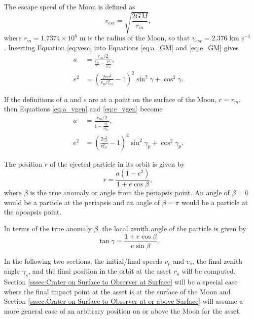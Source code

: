\documentclass{article}
\begin{document}
The escape speed of the Moon is defined as
\begin{equation}\label{eq:vesc}
v_{esc} = \sqrt{\frac{2GM}{r_m}},
\end{equation}
where $r_m = 1.7374\times 10^{6}$ m is the radius of the Moon, so that $v_{esc} = 2.376$ km s$^{-1}$. Inserting Equation \eqref{eq:vesc} into Equations \eqref{eq:a_GM} and \eqref{eq:e_GM} gives
\begin{align}
a &= \frac{r_m/2}{\frac{r_m}{r} - \frac{v^2}{v_{esc}^2}},\label{eq:a_vgen}\\
e^2 &= \left(\frac{2rv^2}{r_m v_{esc}^2} - 1\right)^2\sin^2\gamma + \cos^2\gamma.\label{eq:e_vgen}
\end{align}

If the definitions of $a$ and $e$ are at a point on the surface of the Moon, $r = r_m$, then Equations \eqref{eq:a_vgen} and \eqref{eq:e_vgen} become
\begin{align}
a &= \frac{r_m/2}{1 - \frac{v_p^2}{v_{esc}^2}},\label{eq:a_vrm}\\
e^2 &= \left(\frac{2v_p^2}{v_{esc}^2} - 1\right)^2\sin^2\gamma_p + \cos^2\gamma_p.\label{eq:e_vrm}
\end{align}

The position $r$ of the ejected particle in its orbit is given by
\begin{equation}\label{eq:r_orbit}
r = \frac{a(1-e^2)}{1+e\cos\beta},
\end{equation}
where $\beta$ is the true anomaly or angle from the periapsis point. An angle of $\beta=0$ would be a particle at the periapsis and an angle of $\beta=\pi$ would be a particle at the apoapsis point.

In terms of the true anomaly $\beta$, the local zenith angle of the particle is given by
\begin{equation}\label{eq:tan_gamma}
\tan\gamma = \frac{1+e\cos\beta}{e\sin\beta}.
\end{equation}

In the following two sections, the initial/final speeds $v_p$ and $v_s$, the final zenith angle $\gamma_s$, and the final position in the orbit at the asset $r_s$ will be computed. Section \ref{sssec:Crater on Surface to Observer at Surface} will be a special case where the final impact point at the asset is at the surface of the Moon and Section \ref{sssec:Crater on Surface to Observer at or above Surface} will assume a more general case of an arbitrary position on or above the Moon for the asset.

\end{document}
